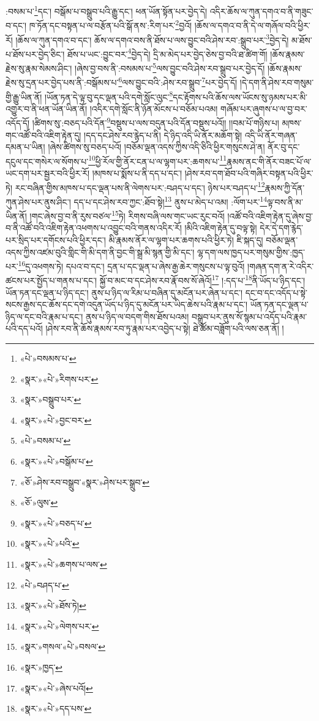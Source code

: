 :བསམ་པ་\footnote{«པེ་»བསམས་པ་}དང་། བསྒོམ་པ་བསྒྲུབ་པའི་རྒྱུ་དང་། ཕན་ཡོན་སྟོན་པར་བྱེད་དེ། འདིར་ཆོས་ལ་ཀུན་དགའ་བ་ནི་གཟུང་བ་དང་། ཁ་ཏོན་དང་བསྟན་པ་ལ་བརྩོན་པའི་སྒོ་ནས་:རིག་པར་\footnote{«སྣར་»«པེ་»རིགས་པར་}བྱའོ། །ཆོས་ལ་དགའ་བ་ནི་དེ་ལ་གཞོལ་བའི་ཕྱིར་རོ། །ཆོས་ལ་ཀུན་དགའ་བ་དང་། ཆོས་ལ་དགའ་བས་ནི་ཐོས་པ་ལས་བྱུང་བའི་ཤེས་རབ་:སྒྲུབ་པར་\footnote{«སྣར་»བསྒྲུབ་པར་}བྱེད་དེ། མ་ཐོས་པ་ཐོས་པར་བྱེད་ཅིང་། ཐོས་པ་ཡང་:བྱུང་བར་\footnote{«སྣར་»«པེ་»བྱང་བར་}བྱེད་དེ། དྲི་མ་མེད་པར་བྱེད་ཅེས་བྱ་བའི་ཐ་ཚིག་གོ། །ཆོས་རྣམས་རྗེས་སུ་རྣམ་སེམས་ཤིང་། །ཞེས་བྱ་བས་ནི་:བསམས་པ་\footnote{«པེ་»བསམ་པ་}ལས་བྱུང་བའི་ཤེས་རབ་སྒྲུབ་པར་བྱེད་དོ། །ཆོས་རྣམས་རྗེས་སུ་དྲན་པར་བྱེད་པས་ནི་:བསྒོམས་པ་\footnote{«སྣར་»«པེ་»བསྒོམ་པ་}ལས་བྱུང་བའི་:ཤེས་རབ་སྒྲུབ་\footnote{«ཅོ་»ཤེས་རབ་བསྒྲུབ་«སྣར་»ཤེས་པར་སྒྲུབ་}པར་བྱེད་དོ། །དེ་དག་ནི་ཤེས་རབ་གསུམ་གྱི་རྒྱུ་ཡིན་ནོ། །ཡོན་ཏན་དེ་ལྟ་བུ་དང་ལྡན་པའི་དགེ་སློང་ལུང་\footnote{«ཅོ་»ལུས་}དང་རྟོགས་པའི་ཆོས་ལས་ཡོངས་སུ་ཉམས་པར་མི་འགྱུར་བ་ནི་ཕན་ཡོན་ཡིན་ནོ། །འདིར་དགེ་སློང་ནི་ཉོན་མོངས་པ་བཅོམ་པའམ། གཞོམ་པར་ཞུགས་པ་ལ་བྱ་བར་འདོད་དོ། །ཚིགས་སུ་:བཅད་པའི་དོན་\footnote{«སྣར་»«པེ་»བཅད་པ་}བསྡུས་པ་ལས་བདུན་པའི་དོན་བསྡུས་པའོ།། །།བམ་པོ་གཉིས་པ། མཁས་གང་འཚོ་བའི་འཇིག་རྟེན་དུ། །དད་དང་ཤེས་རབ་རྙེད་པ་ནི། དེ་ཉིད་འདི་ཡི་ནོར་མཆོག་སྟེ། འདི་ཡི་ནོར་གཞན་དམན་པ་ཡིན། །ཞེས་ཚིགས་སུ་བཅད་པའོ། །བཅོམ་ལྡན་འདས་ཀྱིས་འདི་ཅིའི་ཕྱིར་གསུངས་ཤེ་ན། ནོར་བུ་དང་དངུལ་དང་གསེར་ལ་སོགས་པ་\footnote{«སྣར་»«པེ་»པའི་}ཕྱི་རོལ་གྱི་ནོར་ངན་པ་ལ་ལྷག་པར་:ཆགས་པ་\footnote{«སྣར་»«པེ་»ཆགས་པ་ལས་}རྣམས་ནང་གི་ནོར་བཟང་པོ་ལ་ཡང་དག་པར་སྦྱར་བའི་ཕྱིར་རོ། །མཁས་པ་སྨོས་པ་ནི་དད་པ་དང་། །ཤེས་རབ་དག་ཐོབ་པའི་གཞིར་བསྟན་པའི་ཕྱིར་ཏེ། རང་བཞིན་གྱིས་མཁས་པ་དང་ལྡན་པས་ནི་ལེགས་པར་:བཤད་པ་དང་། ཉེས་པར་བཤད་པ་\footnote{«པེ་»བཤད་པ་}རྣམས་ཀྱི་དོན་ཀུན་ཤེས་པར་ནུས་ཤིང་། དད་པ་དང་ཤེས་རབ་ཀྱང་:ཐོབ་སྟེ།\footnote{«སྣར་»«པེ་»ཐོས་ཏེ།} ནུས་པ་མེད་པ་འམ། :ལོག་པར་\footnote{«སྣར་»«པེ་»ལེགས་པར་}ལྟ་བས་ནི་མ་ཡིན་ནོ། །གང་ཞེས་བྱ་བ་ནི་རུས་བཙལ་\footnote{«སྣར་»གསལ་«པེ་»བསལ་}ཏེ། རིགས་བཞི་ལས་གང་ཡང་རུང་བའོ། །འཚོ་བའི་འཇིག་རྟེན་དུ་ཞེས་བྱ་བ་ནི་འཚོ་བའི་འཇིག་རྟེན་འཕགས་པ་འབྱུང་བའི་གནས་འདིར་རོ། །མིའི་འཇིག་རྟེན་དུ་བལྟ་སྟེ། དེར་དེ་དག་རྙེད་པར་སྲིད་པར་དགོངས་པའི་ཕྱིར་དང་། མི་རྣམས་ནོར་ལ་ལྷག་པར་ཆགས་པའི་ཕྱིར་ཏེ། ཇི་སྐད་དུ། བཅོམ་ལྡན་འདས་ཀྱིས་འཛམ་བུའི་གླིང་གི་མི་དག་ནི་བྱང་གི་སྒྲ་མི་སྙན་གྱི་མི་དང་། ལྷ་དག་ལས་ཁྱད་པར་གསུམ་གྱིས་:ཁྱད་པར་\footnote{«སྣར་»ཁྱད་}དུ་འཕགས་ཏེ། དཔའ་བ་དང་། དྲན་པ་དང་ལྡན་པ་ཞེས་རྒྱ་ཆེར་གསུངས་པ་ལྟ་བུའོ། །གཞན་དག་ན་རེ་འདིར་ཚངས་པར་སྤྱོད་པ་གནས་པ་དང་། སྐྱོ་བ་མང་བ་དང་ཤེས་རབ་རྣོ་བས་སོ་ཞེའོ།\footnote{«སྣར་»«པེ་»ཞེས་པའོ།} །:དད་པ་\footnote{«སྣར་»«པེ་»དད་པས་}ནི་ཡོད་པ་ཉིད་དང་། ཡོན་ཏན་དང་ལྡན་པ་ཉིད་དང་། ནུས་པ་ཉིད་ལ་རིམ་པ་བཞིན་དུ་མངོན་པར་ཞེན་པ་དང་། དང་བ་དང་འདོད་པ་སྟེ་སངས་རྒྱས་དང་ཆོས་དང་དགེ་འདུན་ཡོད་པ་ཉིད་དུ་མངོན་པར་ཡིད་ཆེས་པའི་རྣམ་པ་དང་། ཡོན་ཏན་དང་ལྡན་པ་ཉིད་ལ་དང་བའི་རྣམ་པ་དང་། ནུས་པ་ཉིད་ལ་བདག་གིས་ཐོས་པའམ། བསྒྲུབ་པར་ནུས་སོ་སྙམ་པ་འདོད་པའི་རྣམ་པའི་དད་པའོ། །ཤེས་རབ་ནི་ཆོས་རྣམས་རབ་ཏུ་རྣམ་པར་འབྱེད་པ་སྟེ། ཐེ་ཚོམ་བཟློག་པའི་ལས་ཅན་ནོ། །

